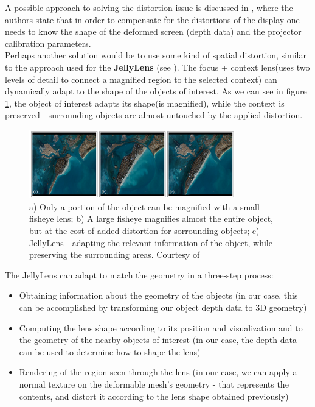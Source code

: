 \documentclass[]{article}
\begin{document}
A possible approach to solving the distortion issue is discussed in \cite{watanabe08}, where the authors state that in order to compensate for the distortions of the display one needs to know the shape of the deformed screen (depth data) and the projector calibration parameters. \\

Perhaps another solution would be to use some kind of spatial distortion, similar to the approach used for the \textbf{JellyLens} (see \cite{pindat12}). The focus + context lens(uses two levels of detail to connect a magnified region to the selected context)  can dynamically adapt to the shape of the objects of interest. As we can see in figure  \ref{fig:JellyLens}, the object of interest adapts its shape(is magnified), while the context is preserved - surrounding objects are almost untouched by the applied distortion.

\begin{figure}[hbtp]
    \centering
    \includegraphics[width=0.8\textwidth]{figures/JellyLens.PNG}
    \caption{a) Only a portion of the object can be magnified with a small fisheye lens; b) A large fisheye magnifies almost the entire object, but at the cost of added distortion for sorrounding objects; c) JellyLens - adapting the relevant information of the object, while preserving the surrounding areas. Courtesy of \cite{pindat12}}
    \label{fig:JellyLens}
\end{figure}

The JellyLens can adapt to match the geometry in a three-step process:
\begin{itemize}
\item Obtaining information about the geometry of the objects (in our case, this can be accomplished by transforming our object depth data to 3D geometry)
\item Computing the lens shape according to its position and visualization and to the geometry of the nearby objects of interest (in our case, the depth data can be used to determine how to shape the lens)
\item Rendering of the region seen through the lens (in our case, we can apply a normal texture on the deformable mesh's geometry - that represents the contents, and distort it according to the lens shape obtained previously)
\end{itemize}
\end{document}
